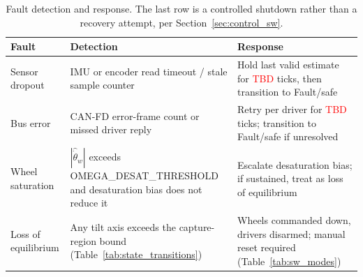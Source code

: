 \begin{table}[htbp]
\centering
\caption[Fault detection and response]{Fault detection and response. The last row is a controlled shutdown
rather than a recovery attempt, per Section~\ref{sec:control_sw}.}
\label{tab:fault_responses}
\small
\begin{tabular}{L{2.6cm} L{4.6cm} L{6.0cm}}
\toprule
Fault & Detection & Response \\
\midrule
Sensor dropout & IMU or encoder read timeout / stale sample counter & Hold last valid estimate for \textcolor{red}{TBD} ticks, then transition to Fault/safe \\
Bus error & CAN-FD error-frame count or missed driver reply & Retry per driver for \textcolor{red}{TBD} ticks; transition to Fault/safe if unresolved \\
Wheel saturation & $|\hat{\dot\theta}_w|$ exceeds OMEGA\_DESAT\_THRESHOLD and desaturation bias does not reduce it & Escalate desaturation bias; if sustained, treat as loss of equilibrium \\
Loss of equilibrium & Any tilt axis exceeds the capture-region bound (Table~\ref{tab:state_transitions}) & Wheels commanded down, drivers disarmed; manual reset required (Table~\ref{tab:sw_modes}) \\
\bottomrule
\end{tabular}
\end{table}
